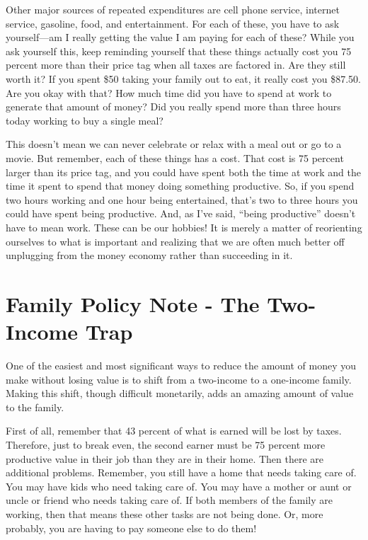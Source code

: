 \documentclass[letterpaper]{article}
\begin{document}
{\color{black}
Other major sources of repeated expenditures are cell phone service,
internet service, gasoline, food, and entertainment. For each of these,
you have to ask yourself—am I really getting the value I am paying for
each of these? While you ask yourself this, keep reminding yourself
that these things actually cost you 75 percent more than their price
tag when all taxes are factored in. Are they still worth it? If you
spent \$50 taking your family out to eat, it really cost you \$87.50.
Are you okay with that? How much time did you have to spend at work to
generate that amount of money? Did you really spend more than three
hours today working to buy a single meal?}

{\color{black}
This doesn’t mean we can never celebrate or relax with a meal out or go
to a movie. But remember, each of these things has a cost. That cost is
75 percent larger than its price tag, and you could have spent both the
time at work and the time it spent to spend that money doing something
productive. So, if you spend two hours working and one hour being
entertained, that’s two to three hours you could have spent being
productive. And, as I’ve said, “being productive” doesn’t have to mean
work. These can be our hobbies!  It is merely a matter of reorienting
ourselves to what is important and realizing that we are often much
better off unplugging from the money economy rather than succeeding in
it.}

\section{Family Policy Note - The Two-Income Trap}
{\color{black}
One of the easiest and most significant ways to reduce the amount of
money you make without losing value is to shift from a two-income to a
one-income family. Making this shift, though difficult monetarily, adds
an amazing amount of value to the family.}

{\color{black}
First of all, remember that 43 percent of what is earned will be lost by
taxes. Therefore, just to break even, the second earner must be 75
percent more productive value in their job than they are in their home.
\textcolor[rgb]{0.32941177,0.5529412,0.83137256}{Then} there are
additional problems. Remember, you still have a home that needs taking
care of. You may have kids who need taking care of. You may have a
mother or aunt or uncle or friend who needs taking care of. If both
members of the family are working, then that means these other tasks
are not being done. Or, more probably, you are having to pay someone
else to do them!}
\end{document}
